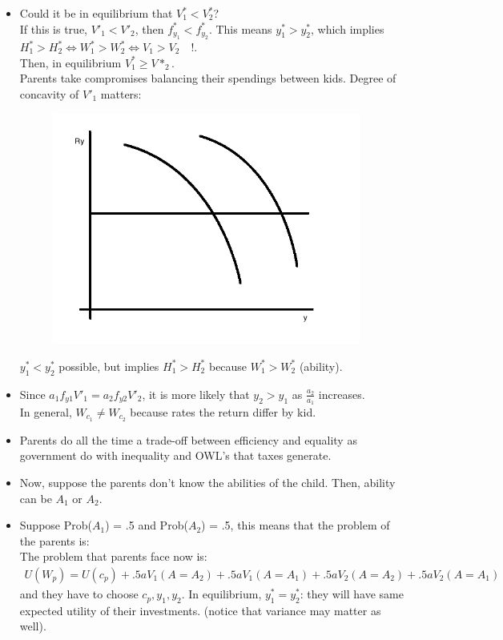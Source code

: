 \documentclass[14pt,notitlepage]{article}
\begin{document}
\begin{itemize}
\item Could it be in equilibrium that $V^*_1 < V^*_2$? \\
If this is true, $V'_1 < V'_2$, then $f^*_{y_1} < f^*_{y_2}$. This means $y^*_1 > y^*_2$, which implies $H^*_1 > H^*_2 \Leftrightarrow W^*_1 > W^*_2 \Leftrightarrow V_1 > V_2 \quad \bm{!}$. \\
Then, in equilibrium $V^*_1\geq V*_2$. \\
Parents take compromises balancing their spendings between kids. Degree of concavity of $V'_1$ matters:

\begin{center}
\begin{figure}[H] 
\caption{}
\centering
\includegraphics[width=4in, height=3in]{plot9.png}
\end{figure}
\end{center}

$y^*_1 < y^*_2$ possible, but implies $H^*_1 > H^*_2$ because $W^*_1 > W^*_2$ (ability).
\item Since $a_1f_{y1}V'_1 = a_2f_{y2}V'_2$, it is more likely that $y_2 > y_1$ as $\frac{a_2}{a_1}$ increases. \\
In general, $W_{c_1} \neq W_{c_2}$ because rates the return differ by kid.
\item Parents do all the time a trade-off between efficiency and equality as government do with inequality and OWL's that taxes generate.
\item Now, suppose the parents don't know the abilities of the child. Then, ability can be $A_1$ or $A_2$.
\item Suppose Prob($A_1$) = .5 and Prob($A_2$) = .5, this means that the problem of the parents is: \\
The problem that parents face now is:
\begin{align*}
U(W_p) = U(c_p) + .5 a V_1 (A = A_2) + .5 a V_1 (A=A_1) + .5 a V_2 (A=A_2) + .5 a V_2 (A=A_1)
\end{align*}
and they have to choose $c_p,y_1,y_2$. In equilibrium, $y^*_1 = y^*_2$: they will have same expected utility of their investments. (notice that variance may matter as well).
\end{itemize}
\end{document}
